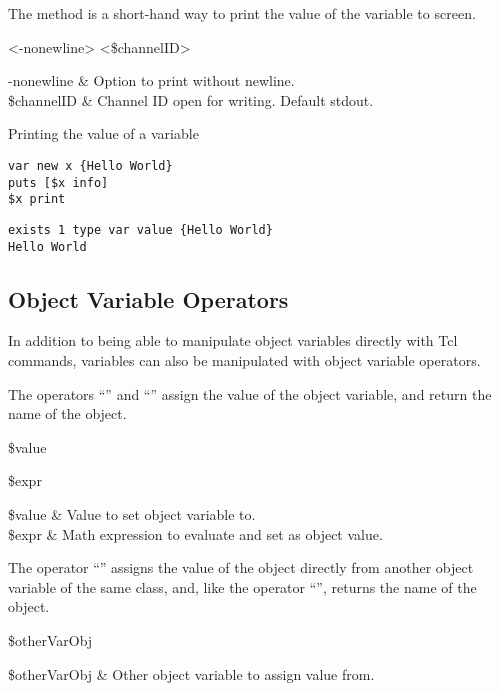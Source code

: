 \documentclass{article}
\begin{document}
The method  is a short-hand way to print the value of the variable to screen.
\begin{syntax}
 <-nonewline> <\$channelID>
\end{syntax}
\begin{args}
-nonewline & Option to print without newline. \\
\$channelID & Channel ID open for writing. Default stdout.
\end{args}
\begin{example}{Printing the value of a variable}
\begin{lstlisting}
var new x {Hello World}
puts [$x info]
$x print
\end{lstlisting}
\tcblower
\begin{lstlisting}
exists 1 type var value {Hello World}
Hello World
\end{lstlisting}
\end{example}

\clearpage
\subsection{Object Variable Operators}
In addition to being able to manipulate object variables directly with Tcl commands, variables can also be manipulated with object variable operators.

The operators ``\texttt{}'' and ``\texttt{}'' assign the value of the object variable, and return the name of the object.
\begin{syntax}
 \$value
\end{syntax}
\begin{syntax}
 \$expr
\end{syntax}
\begin{args}
\$value & Value to set object variable to. \\
\$expr & Math expression to evaluate and set as object value.
\end{args}

The operator ``\texttt{}'' assigns the value of the object directly from another object variable of the same class, and, like the operator  ``\texttt{}'', returns the name of the object.
\begin{syntax}
 \$otherVarObj 
\end{syntax}
\begin{args}
\$otherVarObj & Other object variable to assign value from.
\end{args}
\end{document}
